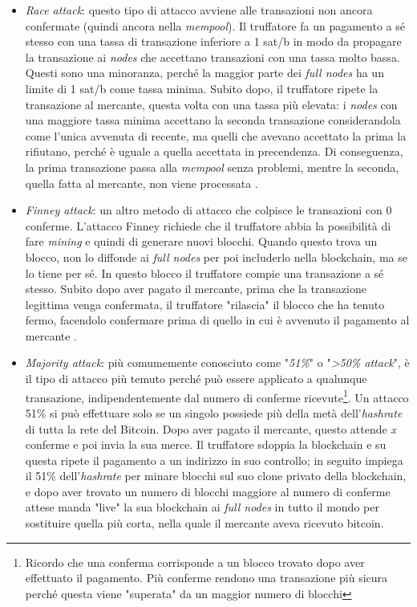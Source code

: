 \documentclass {article}
\begin{document}
\begin{itemize}
\item \textit{Race attack}: questo tipo di attacco avviene alle transazioni non ancora confermate (quindi ancora nella \textit{mempool}).
Il truffatore fa un pagamento a sé stesso con una tassa di transazione inferiore a 1 sat/b in modo da propagare la transazione ai \textit{nodes} che accettano transazioni con una tassa molto bassa.
Questi sono una minoranza, perché la maggior parte dei \textit{full nodes} ha un limite di 1 sat/b come tassa minima.
Subito dopo, il truffatore ripete la transazione al mercante, questa volta con una tassa più elevata: i \textit{nodes} con una maggiore tassa minima accettano la seconda transazione considerandola come l'unica avvenuta di recente, ma quelli che avevano accettato la prima la rifiutano, perché è uguale a quella accettata in precendenza.
Di conseguenza, la prima transazione passa alla \textit{mempool} senza problemi, mentre la seconda, quella fatta al mercante, non viene processata \cite{raceattack}\cite{attacks}.
\item \textit{Finney attack}: un altro metodo di attacco che colpisce le transazioni con 0 conferme. L'attacco Finney richiede che il truffatore abbia la possibilità di fare \textit{mining} e quindi di generare nuovi blocchi.
Quando questo trova un blocco, non lo diffonde ai \textit{full nodes} per poi includerlo nella blockchain, ma se lo tiene per sé.
In questo blocco il truffatore compie una transazione a sé stesso.
Subito dopo aver pagato il mercante, prima che la transazione legittima venga confermata, il truffatore "rilascia" il blocco che ha tenuto fermo, facendolo confermare prima di quello in cui è avvenuto il pagamento al mercante \cite{attacks}.
\item \textit{Majority attack}: più comumemente conosciuto come "\textit{51\%}" o "\textit{>50\% attack}", è il tipo di attacco più temuto perché può essere applicato a qualunque transazione, indipendentemente dal numero di conferme ricevute\footnote{Ricordo che una conferma corrisponde a un blocco trovato dopo aver effettuato il pagamento.
Più conferme rendono una transazione più sicura perché questa viene "superata" da un maggior numero di blocchi}.
Un attacco 51\% si può effettuare solo se un singolo possiede più della metà dell'\textit{hashrate} di tutta la rete del Bitcoin.
Dopo aver pagato il mercante, questo attende \textit{x} conferme e poi invia la sua merce.
Il truffatore sdoppia la blockchain e su questa ripete il pagamento a un indirizzo in suo controllo; in seguito impiega il 51\% dell'\textit{hashrate} per minare blocchi sul suo clone privato della blockchain, e dopo aver trovato un numero di blocchi maggiore al numero di conferme attese manda "live" la sua blockchain ai \textit{full nodes} in tutto il mondo per sostituire quella più corta, nella quale il mercante aveva ricevuto bitcoin\cite{attacks}.
\end{itemize}
\end{document}

